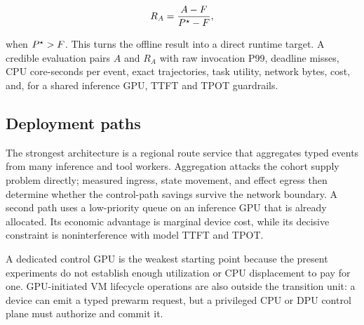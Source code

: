 \begin{equation}
  R_A=\frac{A-F}{P^\star-F},
  \label{eq:online-recovery}
\end{equation}

when $P^\star>F$. This turns the offline result into a direct runtime target. A
credible evaluation pairs $A$ and $R_A$ with raw invocation P99, deadline
misses, CPU core-seconds per event, exact trajectories, task utility, network
bytes, cost, and, for a shared inference GPU, TTFT and TPOT guardrails.

\subsection{Deployment paths}

The strongest architecture is a regional route service that aggregates typed
events from many inference and tool workers. Aggregation attacks the cohort
supply problem directly; measured ingress, state movement, and effect egress
then determine whether the control-path savings survive the network boundary.
A second path uses a low-priority queue on an inference GPU that is already
allocated. Its economic advantage is marginal device cost, while its decisive
constraint is noninterference with model TTFT and TPOT.

A dedicated control GPU is the weakest starting point because the present
experiments do not establish enough utilization or CPU displacement to pay for
one. GPU-initiated VM lifecycle operations are also outside the transition
unit: a device can emit a typed prewarm request, but a privileged CPU or DPU
control plane must authorize and commit it.
